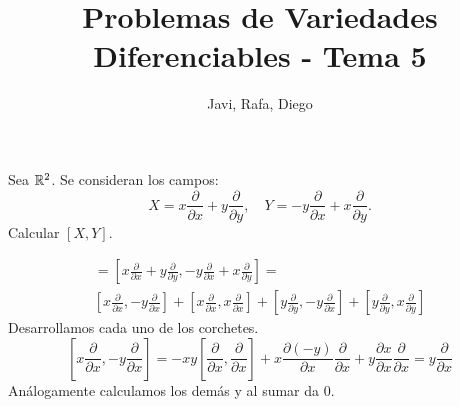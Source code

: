\documentclass[twoside]{article}
\begin{document}
\title{Problemas de Variedades Diferenciables - Tema 5}
\author{Javi, Rafa, Diego}
\maketitle

\begin{ejercicio}{3}
Sea $\mathbb{R}^2$. Se consideran los campos:
\[
X=x\frac{\partial}{\partial x}+y\frac{\partial}{\partial y},\quad Y=-y\frac{\partial}{\partial x}+x\frac{\partial}{\partial y}.
\]
Calcular $[X,Y]$.
\end{ejercicio}
\begin{solucion}
\begin{gather*}
[X,Y]=\left[x\frac{\partial}{\partial x}+y\frac{\partial}{\partial y}, -y\frac{\partial}{\partial x}+x\frac{\partial}{\partial y}\right]=\\
\left[x\frac{\partial}{\partial x},-y\frac{\partial}{\partial x}\right]+\left[x\frac{\partial}{\partial x},x\frac{\partial}{\partial x}\right]+\left[y\frac{\partial}{\partial y},-y\frac{\partial}{\partial x}\right]+\left[y\frac{\partial}{\partial y},x\frac{\partial}{\partial y}\right]
\end{gather*}
Desarrollamos cada uno de los corchetes.
\[
\left[x\frac{\partial}{\partial x},-y\frac{\partial}{\partial x}\right]=-xy\left[\frac{\partial}{\partial x},\frac{\partial}{\partial x}\right]+x\frac{
\partial (-y)}{\partial x}\frac{\partial}{\partial x}+y\frac{\partial x}{\partial x}\frac{\partial}{\partial x}=y\frac{\partial}{\partial x}
\]
Análogamente calculamos los demás y al sumar da 0.
\end{solucion}
\end{document}
